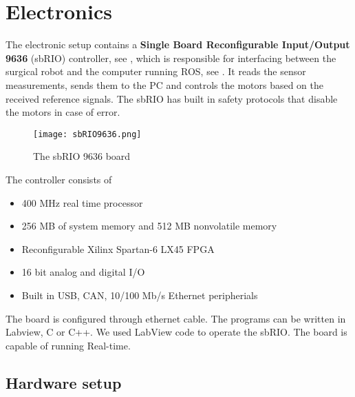 \section{Electronics}\label{sec:electronics}

The electronic setup \cite{Chris_Surgical} contains a \textbf{Single Board Reconfigurable Input/Output 9636} (sbRIO) controller, see , which is responsible for interfacing between the surgical robot and the computer running ROS, see . It reads the sensor measurements, sends them to the PC and controls the motors based on the received reference signals. The sbRIO has built in safety protocols that disable the motors in case of error.

\begin{figure}[H]
	\centering
		\centering
		\texttt{[image: sbRIO9636.png]}
		\caption{The sbRIO 9636 board\cite{sbRIO9636Pic}}
		\label{fig:sbRIO9636}
\end{figure}


The controller consists of
\begin{itemize}
	\item 400 MHz real time processor
	\item 256 MB of system memory and 512 MB nonvolatile memory
	\item Reconfigurable Xilinx Spartan-6 LX45 FPGA
	\item 16 bit analog and digital I/O
	\item Built in USB, CAN, 10/100 Mb/s Ethernet peripherials
\end{itemize}

The board is configured through ethernet cable. The programs can be written in Labview, C or C++. We used LabView code to operate the sbRIO. The board is capable of running Real-time. %


\subsection{Hardware setup}

